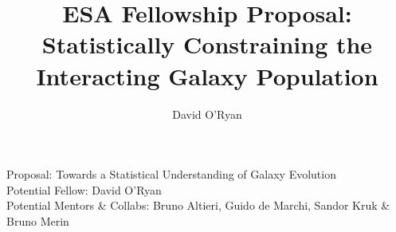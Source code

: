 \documentclass[11pt]{article}
\title{ESA Fellowship Proposal: Statistically Constraining the Interacting Galaxy Population}
\author{David O'Ryan}
\begin{document}
    \begin{center}
        \large{{Proposal: Towards a Statistical Understanding of Galaxy Evolution \\
        Potential Fellow: David O'Ryan \\
        Potential Mentors \& Collabs: Bruno Altieri, Guido de Marchi, Sandor Kruk \& Bruno Merin}}
    \end{center}
    
\end{document}
